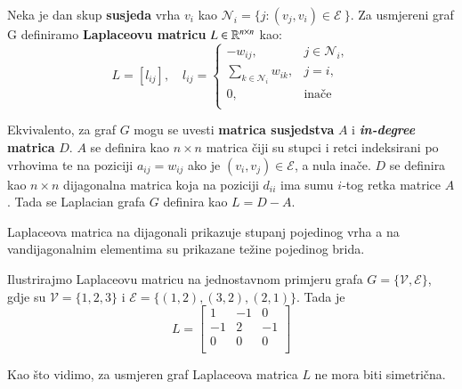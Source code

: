 \begin{defn}
Neka je dan skup \textbf{susjeda} vrha $v_i$ kao $\mathcal{N}_i = \{j : (v_j,v_i) \in \mathcal{E} \:\}$.
    Za usmjereni graf G definiramo \textbf{Laplaceovu matricu} $L \in \mathbb{R}^{n \times n}$ kao:
    $$L = \left[ l_{ij} \right], \quad l_{ij} = 
    \begin{cases}
        - w_{ij}, & j \in \mathcal{N}_i, \\
        \sum\limits_{k\in \mathcal{N}_i} w_{ik}, & j=i,\\
        0, & \text{inače}\\
    \end{cases}$$
\end{defn}
\begin{rem}
    Ekvivalento, za graf $G$ mogu se uvesti \textbf{matrica susjedstva} $A$ i \textbf{\emph{in-degree} matrica} $D$. $A$ se definira kao $n \times n$ matrica čiji su stupci i retci indeksirani po vrhovima te na poziciji $a_{ij} = w_{ij}$ ako je $(v_i, v_j) \in \mathcal{E}$, a nula inače. $D$ se definira kao $n \times n$ dijagonalna matrica koja na poziciji $d_{ii}$ ima sumu $i$-tog retka matrice $A$. Tada se Laplacian grafa $G$ definira kao $L = D-A$.
\end{rem}
Laplaceova matrica na dijagonali prikazuje stupanj pojedinog vrha a na vandijagonalnim elementima su prikazane težine pojedinog brida.
\begin{exa}
    Ilustrirajmo Laplaceovu matricu na jednostavnom primjeru grafa
$G = \{ \mathcal{V}, \mathcal{E}\}$, gdje su $\mathcal{V} = \{1,2,3\}$ i $\mathcal{E} = \{(1,2), (3,2), (2,1)\}$. Tada je $$L = \begin{bmatrix}
    1 & -1 & 0 \\
    -1 & 2 & -1 \\
    0 & 0 & 0\\
\end{bmatrix}$$
\end{exa}
Kao što vidimo, za usmjeren graf Laplaceova matrica $L$ ne mora biti simetrična.

